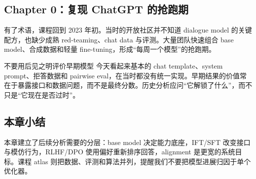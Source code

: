 
\subsection{Chapter 0：复现 ChatGPT 的抢跑期}

有了术语，课程回到 2023 年初。当时的开放社区并不知道 dialogue model 的关键配方，也缺少成熟 red-teaming、chat data 与评测。大量团队快速组合 base model、合成数据和轻量 fine-tuning，形成“每周一个模型”的抢跑期。


\begin{warningbox}{不要用后见之明评价早期模型}
今天看起来基本的 chat template、system prompt、拒答数据和 pairwise eval，在当时都没有统一实现。早期结果的价值常在于暴露接口和数据问题，而不是最终分数。历史分析应问“它解锁了什么”，而不只是“它现在是否过时”。
\end{warningbox}


\subsection{本章小结}

本章建立了后续分析需要的分层：base model 决定能力底座，IFT/SFT 改变接口与模仿行为，RLHF/DPO 使用偏好重新排序回答，alignment 是更宽的系统目标。课程 atlas 则把数据、评测和算法并列，提醒我们不要把模型进展归因于单个优化器。

